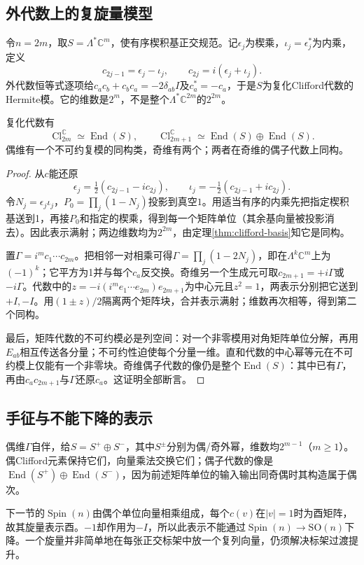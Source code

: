 \subsection{外代数上的复旋量模型}
令$n=2m$，取$S=\Lambda^*\mathbb C^m$，使有序楔积基正交规范。记$\epsilon_j$为楔乘，$\iota_j=\epsilon_j^*$为内乘，定义
\begin{equation}\label{eq:spin-fock}
 c_{2j-1}=\epsilon_j-\iota_j,\qquad
 c_{2j}=i(\epsilon_j+\iota_j).
\end{equation}
外代数恒等式逐项给$c_ac_b+c_bc_a=-2\delta_{ab}I$及$c_a^*=-c_a$，于是$S$为复化Clifford代数的Hermite模。它的维数是$2^m$，不是整个$\Lambda^*\mathbb C^{2m}$的$2^{2m}$。

\begin{proposition}\label{prop:complex-clifford}
复化代数有
\[
 \operatorname{Cl}_{2m}^{\mathbb C}\simeq\operatorname{End}(S),\qquad
 \operatorname{Cl}_{2m+1}^{\mathbb C}\simeq
 \operatorname{End}(S)\oplus\operatorname{End}(S).
\]
偶维有一个不可约复模的同构类，奇维有两个；两者在奇维的偶子代数上同构。
\end{proposition}
\begin{proof}
从$c$能还原
\[
 \epsilon_j=\tfrac12(c_{2j-1}-ic_{2j}),\qquad
 \iota_j=-\tfrac12(c_{2j-1}+ic_{2j}).
\]
令$N_j=\epsilon_j\iota_j$，$P_0=\prod_j(1-N_j)$投影到真空$1$。用适当有序的内乘先把指定楔积基送到1，再接$P_0$和指定的楔乘，得到每一个矩阵单位（其余基向量被投影消去）。因此表示满射；两边维数均为$2^{2m}$，由定理\ref{thm:clifford-basis}知它是同构。

置$\Gamma=i^mc_1\cdots c_{2m}$。把相邻一对相乘可得$\Gamma=\prod_j(1-2N_j)$，即在$\Lambda^k\mathbb C^m$上为$(-1)^k$；它平方为1并与每个$c_a$反交换。奇维另一个生成元可取$c_{2m+1}=+i\Gamma$或$-i\Gamma$。代数中的$z=-i(i^me_1\cdots e_{2m})e_{2m+1}$为中心元且$z^2=1$，两表示分别把它送到$+I,-I$。用$(1\pm z)/2$隔离两个矩阵块，合并表示满射；维数再次相等，得到第二个同构。

最后，矩阵代数的不可约模必是列空间：对一个非零模用对角矩阵单位分解，再用$E_{ab}$相互传送各分量；不可约性迫使每个分量一维。直和代数的中心幂等元在不可约模上仅能有一个非零块。奇维偶子代数的像仍是整个$\operatorname{End}(S)$：其中已有$\Gamma$，再由$c_ac_{2m+1}$与$\Gamma$还原$c_a$。这证明全部断言。
\end{proof}

\subsection{手征与不能下降的表示}
偶维$\Gamma$自伴，给$S=S^+\oplus S^-$，其中$S^\pm$分别为偶/奇外幂，维数均$2^{m-1}$（$m\geq1$）。偶Clifford元素保持它们，向量乘法交换它们；偶子代数的像是$\operatorname{End}(S^+)\oplus\operatorname{End}(S^-)$，因为前述矩阵单位的输入输出同奇偶时其构造属于偶次。

下一节的$\operatorname{Spin}(n)$由偶个单位向量相乘组成，每个$c(v)$在$|v|=1$时为酉矩阵，故其旋量表示酉。$-1$却作用为$-I$，所以此表示不能通过$\operatorname{Spin}(n)\to\mathrm{SO}(n)$下降。一个旋量并非简单地在每张正交标架中放一个复列向量，仍须解决标架过渡提升。
